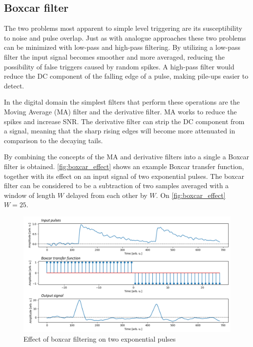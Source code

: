 \subsection{Boxcar filter}

The two problems most apparent to simple level triggering 
are its susceptibility to noise and pulse overlap.
Just as with analogue approaches these two problems 
can be minimized with low-pass and high-pass filtering.
By utilizing a low-pass filter the input signal becomes 
smoother and more averaged, reducing the possibility of 
false triggers caused by random spikes. A high-pass filter
would reduce the DC component of the falling edge of a pulse,
making pile-ups easier to detect.


In the digital domain the simplest filters that perform
these operations are the Moving Average (MA) filter and 
the derivative filter. MA works to reduce the spikes and increase 
SNR. The derivative filter can strip the DC component from
a signal, meaning that the sharp rising edges will become
more attenuated in comparison to the decaying tails.


By combining the concepts of the MA and derivative filters
into a single a Boxcar filter is obtained. 
\autoref{fig:boxcar_effect} shows an example Boxcar transfer function,
together with its effect on an input signal of two exponential pulses.
The boxcar filter can be considered
to be a subtraction of two samples averaged with a window
of length $W$ delayed from each other by $W$. 
On \autoref{fig:boxcar_effect} $W=25$.
\begin{figure}[H]
  \centering
  \includegraphics[width=\linewidth]{media/boxcar_effect.png}
  \caption{Effect of boxcar filtering on two exponential pulses}
  \label{fig:boxcar_effect} 
\end{figure}

